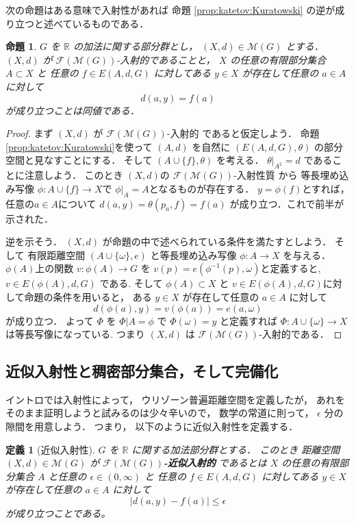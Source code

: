 \documentclass[leqno, 12pt]{jsarticle}
\newtheorem{prop}[thm]{命題}
\newtheorem{df}[thm]{定義}
\newcommand{\rr}{\mathbb{R}}
\begin{document}
次の命題はある意味で入射性があれば
命題
\ref{prop:katetov:Kuratowski}
の逆が成り立つと述べているものである．
\begin{prop}\label{prop:katetov:injandpt}
$G$
を
$\rr$
の加法に関する部分群とし，
$(X, d)\in \mathscr{M}(G)$
とする．
$(X, d)$
が
$\mathscr{F}(\mathscr{M}(G))$-入射的であることと，
$X$
の任意の有限部分集合
$A\subset X$
と
任意の
$f\in E(A, d, G)$
に対してある
$y\in X$
が存在して任意の
$a\in A$に対して
\[
d(a, y)=f(a)
\]
が成り立つことは同値である．
\end{prop}
\begin{proof}
まず
$(X, d)$
が
$\mathscr{F}(\mathscr{M}(G))$-入射的
であると仮定しよう．
命題 \ref{prop:katetov:Kuratowski}を使って
$(A, d)$
を自然に
$(E(A, d, G), \theta)$
の部分空間と見なすことにする．
そして
$(A\cup\{f\}, \theta)$
を考える．
$\theta|_{A^2}=d$
であることに注意しよう．
このとき
$(X, d)$の
$\mathscr{F}(\mathscr{M}(G))$-入射性質
から
等長埋め込み写像
$\phi\colon A\cup\{f\}\to X$で
$\phi|_A=A$となるものが存在する．
$y=\phi(f)$とすれば，
任意の$a\in A$について
$d(a, y)=\theta(p_a, f)=f(a)$
が成り立つ．これで前半が示された．


逆を示そう．
$(X, d)$
が命題の中で述べられている条件を満たすとしよう．
そして
有限距離空間
$(A\cup \{\omega\}, e)$
と等長埋め込み写像
$\phi\colon A\to X$
を与える．
$\phi(A)$上の関数
$v\colon  \phi(A)\to G$
を
$v(p)=e(\phi^{-1}(p),\omega)$と定義すると, 
$v\in E(\phi(A), d, G)$
である.
そして
$\phi(A)\subset X$
と
$v\in E(\phi(A), d, G)$に対して命題の条件を用いると，
ある
$y\in X$
が存在して任意の
$a\in A$
に対して
\[
d(\phi(a), y)=v(\phi(a))=e(a, \omega)
\]
が成り立つ．
よって
$\Phi$
を
$\Phi|A=\phi$
で
$\Phi(\omega)=y$
と定義すれば
$\Phi\colon A\cup\{\omega\}\to X$
は等長写像になっている.
つまり
$(X, d)$
は
$\mathscr{F}(\mathscr{M}(G))$-入射的である．
\end{proof}


\subsection{近似入射性と稠密部分集合，そして完備化}

イントロでは入射性によって，
ウリゾーン普遍距離空間を定義したが，
あれをそのまま証明しようと試みるのは少々辛いので，
数学の常道に則って，
$\epsilon$
分の隙間を用意しよう．
つまり，
以下のように近似入射性を定義する．
\begin{df}[近似入射性]\label{df:katetov:apprxinj}
$G$
を
$\rr$
に関する加法部分群とする．
このとき
距離空間
$(X, d)\in \mathscr{M}(G)$
が
\textbf{$\mathscr{F}(\mathscr{M}(G))$-近似入射的}
であるとは
$X$
の任意の有限部分集合
$A$
と任意の
$\epsilon\in (0, \infty)$
と
任意の
$f\in E(A, d, G)$
に対してある
$y\in X$
が存在して任意の
$a\in A$
に対して
\[
|d(a, y)-f(a)|\le \epsilon 
\]
が成り立つことである。
\end{df}
\end{document}

